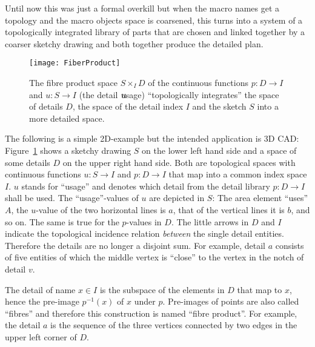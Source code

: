 \documentclass[5p]{elsarticle}
\newcommand{\qq}[1]{``#1''}
\begin{document}
Until now this was just a formal overkill but when the macro names get a topology and 
the macro objects space is coarsened, this turns into a system of a topologically integrated 
library of parts that are chosen and linked together by a coarser sketchy drawing and both 
together produce the detailed plan. 

\begin{figure}[t]
\begin{center}
\texttt{[image: FiberProduct]}
\end{center}
\caption{The fibre product space $S\times_I D$ of the continuous functions ${p:D\to I}$ and 
${u:S\to I}$ (the detail \textbf{\textit{u}}sage) \qq{topologically integrates} the space of 
details $D$, the space of the detail index $I$ and the sketch $S$ into a more detailed space.}
\label{fig:FiberProduct}
\end{figure}

The following is a simple 2D-example but the intended application is 3D CAD:
Figure~\ref{fig:FiberProduct} shows a sketchy drawing $S$ on the lower left hand side and a 
space of some details $D$ on the upper right hand side. Both are topological spaces with 
continuous functions $u:S\to I$ and $p:D\to I$ that map into a common index space $I$. 
$u$ stands for \qq{usage} and denotes which detail from the detail library $p:D\to I$ shall be 
used. 
The \qq{usage}-values of $u$ are depicted in $S$: The area element \qq{uses} $A$, the $u$-value 
of the two horizontal lines is $a$, that of the vertical lines it is $b$, and so on. 
The same is true for the $p$-values in $D$. 
The little arrows in $D$ and $I$ indicate the topological incidence relation \emph{between} 
the single detail entities. Therefore the details are no longer a disjoint sum.  
For example, detail $a$ consists of five entities of which the middle vertex 
is \qq{close} to the vertex in the notch of detail $v$. 


The detail of name $x\in I$ is the subspace of the elements in $D$ that map to 
$x$, hence the pre-image $p^{-1}(x)$ of $x$ under $p$. 
Pre-images of points are also called \qq{fibres} and therefore this construction is named 
\qq{fibre product}. For example, the detail $a$ is the sequence of the three vertices 
connected by two edges in the upper left corner of $D$. 
\end{document}
